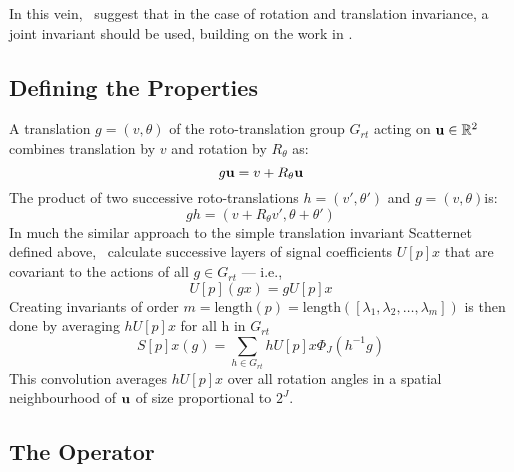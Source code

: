   In this vein, \Bruna\ suggest that in the case of rotation and translation
  invariance, a joint invariant should be used, building on the work in
  \cite{citti_cortical_2006, boscain_anthropomorphic_2010,
  sgallari_scale_2007}. 


\subsection{Defining the Properties}
  A translation $g = (v, \theta)$ of the roto-translation group $G_{rt}$ acting on
  $\mathbf{u} \in \mathbb{R}^2$ combines translation by $v$ and rotation by
  $R_{\theta}$ as:
  \begin{equation}
    g\mathbf{u} = v + R_{\theta}\mathbf{u}
  \end{equation}
  The product of two successive roto-translations $h=(v',
  \theta ')$ and $g = (v, \theta) $is:
  \begin{equation}
    gh = (v + R_{\theta}v', \theta + \theta')
  \end{equation}
  In much the similar approach to the simple translation invariant Scatternet defined
  above, \Bruna\ calculate successive layers of signal coefficients $U[p]x$ that
  are covariant to the actions of all $g \in G_{rt}$ --- i.e.,\ 
  \begin{equation}
    U[p](gx) = gU[p]x
  \end{equation}
  Creating invariants of order $m = \mathrm{length}(p)
  = \mathrm{length}([\lambda_1, \lambda_2, \ldots, \lambda_m])$ is then done by
  averaging $hU[p]x$ for all h in $G_{rt}$
  \begin{equation}
    S[p]x(g) = \sum_{h \in G_{rt}} hU[p]x \Phi_J(h^{-1}g)
  \end{equation}
  This convolution averages $hU[p]x$ over all rotation angles in a spatial
  neighbourhood of $\mathbf{u}$ of size proportional to $2^J$.

\subsection{The Operator}
